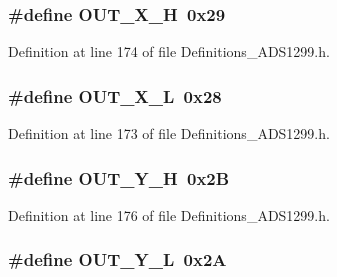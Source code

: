 \subsubsection[{\texorpdfstring{O\+U\+T\+\_\+\+X\+\_\+H}{OUT_X_H}}]{\setlength{\rightskip}{0pt plus 5cm}\#define O\+U\+T\+\_\+\+X\+\_\+H~0x29}\hypertarget{group__Definitions__ADS1299_gaf3419eb79d96b0179006217d77eb093c}{}\label{group__Definitions__ADS1299_gaf3419eb79d96b0179006217d77eb093c}


Definition at line 174 of file Definitions\+\_\+\+A\+D\+S1299.\+h.

\subsubsection[{\texorpdfstring{O\+U\+T\+\_\+\+X\+\_\+L}{OUT_X_L}}]{\setlength{\rightskip}{0pt plus 5cm}\#define O\+U\+T\+\_\+\+X\+\_\+L~0x28}\hypertarget{group__Definitions__ADS1299_ga7a4d341c8dd90a78b5d073c450ad9fe6}{}\label{group__Definitions__ADS1299_ga7a4d341c8dd90a78b5d073c450ad9fe6}


Definition at line 173 of file Definitions\+\_\+\+A\+D\+S1299.\+h.

\subsubsection[{\texorpdfstring{O\+U\+T\+\_\+\+Y\+\_\+H}{OUT_Y_H}}]{\setlength{\rightskip}{0pt plus 5cm}\#define O\+U\+T\+\_\+\+Y\+\_\+H~0x2B}\hypertarget{group__Definitions__ADS1299_gac1dcb47bc35099013ba90efe93d108fd}{}\label{group__Definitions__ADS1299_gac1dcb47bc35099013ba90efe93d108fd}


Definition at line 176 of file Definitions\+\_\+\+A\+D\+S1299.\+h.

\subsubsection[{\texorpdfstring{O\+U\+T\+\_\+\+Y\+\_\+L}{OUT_Y_L}}]{\setlength{\rightskip}{0pt plus 5cm}\#define O\+U\+T\+\_\+\+Y\+\_\+L~0x2A}\hypertarget{group__Definitions__ADS1299_gafb7888eaca1ba1dd4c7702a7da5b132e}{}\label{group__Definitions__ADS1299_gafb7888eaca1ba1dd4c7702a7da5b132e}


